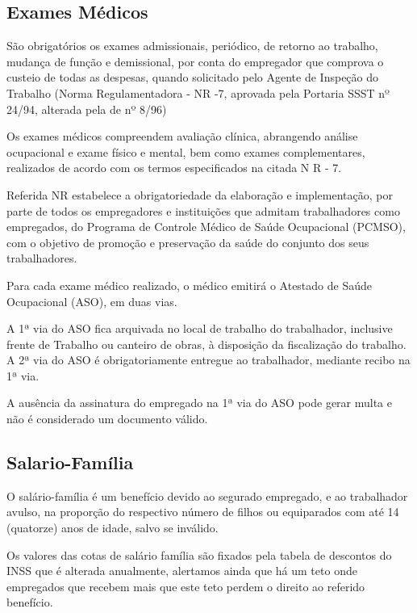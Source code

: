 \documentclass{article}
\begin{document}
\subsection{Exames Médicos}
\label{ins:medico}
São obrigatórios os exames admissionais, periódico, de retorno ao trabalho, mudança de função e demissional, por conta do empregador que comprova o custeio de todas as despesas, quando solicitado pelo Agente de Inspeção do Trabalho (Norma Regulamentadora - NR -7, aprovada pela Portaria SSST nº 24/94, alterada pela de nº 8/96) 

Os exames médicos compreendem avaliação clínica, abrangendo análise ocupacional e exame físico e mental, bem como exames complementares, realizados de acordo com os termos especificados na citada N R - 7. 

Referida NR estabelece a obrigatoriedade da elaboração e implementação, por parte de todos os empregadores e instituições que admitam trabalhadores como empregados, do Programa de Controle Médico de Saúde Ocupacional (PCMSO), com o objetivo de promoção e preservação da saúde do conjunto dos seus trabalhadores. 

Para cada exame médico realizado, o médico emitirá o Atestado de Saúde Ocupacional (ASO), em duas vias. 

A 1ª via do ASO fica arquivada no local de trabalho do trabalhador, inclusive frente de Trabalho ou canteiro de obras, à disposição da fiscalização do trabalho. A 2ª via do ASO é obrigatoriamente entregue ao trabalhador, mediante recibo na 1ª via.

\begin{tcolorbox}[title=Atenção!]
  A ausência da assinatura do empregado na 1ª via do ASO pode gerar multa e não é considerado um documento válido.
\end{tcolorbox}

\subsection{Salario-Família}
\label{ins:sal-fam}
O salário-família é um benefício devido ao segurado empregado, e ao trabalhador avulso, na proporção do respectivo número de filhos ou equiparados com até 14 (quatorze) anos de idade, salvo se inválido. 

Os valores das cotas de salário família são fixados pela tabela de descontos do INSS que é alterada anualmente, alertamos ainda que há um teto onde empregados que recebem mais que este teto perdem o direito ao referido benefício.
\end{document}
